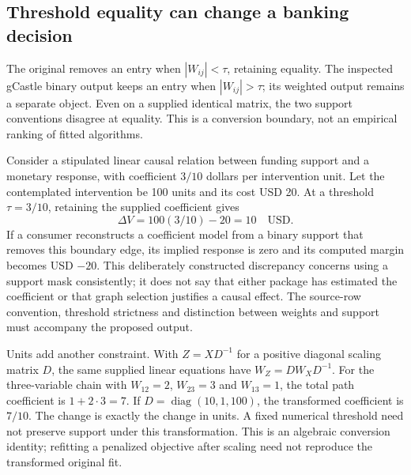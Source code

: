 \subsection{Threshold equality can change a banking decision}
\label{exec23:notears-threshold}
The original removes an entry when $|W_{ij}|<\tau$, retaining equality.
The inspected gCastle binary output keeps an entry when $|W_{ij}|>\tau$;
its weighted output remains a separate object. Even on a supplied identical
matrix, the two support conventions disagree at equality. This is a conversion
boundary, not an empirical ranking of fitted algorithms.
\citep{exec23_notears_source,exec20_gcastle_source}

Consider a stipulated linear causal relation between funding support and a
monetary response, with coefficient $3/10$ dollars per intervention unit.
Let the contemplated intervention be 100 units and its cost USD 20.
At a threshold $\tau=3/10$, retaining the supplied coefficient gives
\begin{equation}
 \Delta V=100(3/10)-20=10\quad\text{USD}.
 \label{exec23:notears-value}
\end{equation}
If a consumer reconstructs a coefficient model from a binary support that
removes this boundary edge, its implied response is zero and its computed
margin becomes USD $-20$. This deliberately constructed discrepancy concerns
using a support mask consistently; it does not say that either package has
estimated the coefficient or that graph selection justifies a causal effect.
The source-row convention, threshold strictness and distinction between
weights and support must accompany the proposed output.
\citep{exec23_notears_reference}

Units add another constraint. With $Z=XD^{-1}$ for a positive diagonal scaling
matrix $D$, the same supplied linear equations have $W_Z=DW_XD^{-1}$.
For the three-variable chain with $W_{12}=2$, $W_{23}=3$ and $W_{13}=1$,
the total path coefficient is $1+2\cdot3=7$.
If $D=\operatorname{diag}(10,1,100)$, the transformed coefficient is $7/10$.
The change is exactly the change in units. A fixed numerical threshold need
not preserve support under this transformation. This is an algebraic conversion
identity; refitting a penalized objective after scaling need not reproduce
the transformed original fit.~\citep{exec23_notears_reference}


